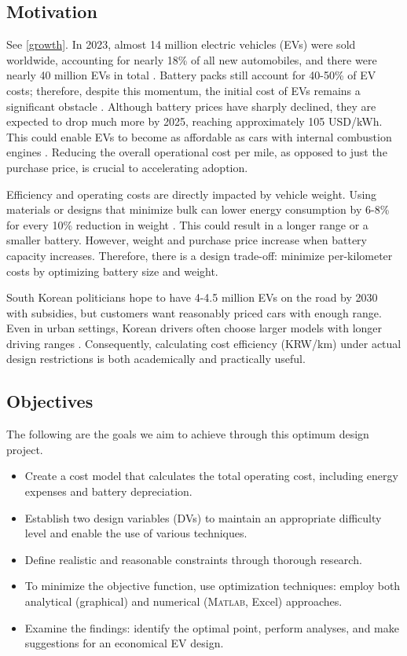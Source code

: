 \documentclass[11pt,twocolumn]{article}
\begin{document}
        \subsection{Motivation}
            See \cref{growth}.
            In 2023, almost 14 million electric vehicles (EVs) were sold worldwide, accounting for nearly 18\% of all new automobiles, and there were nearly 40 million EVs in total \cite{iea24}.
            Battery packs still account for 40-50\% of EV costs; therefore, despite this momentum, the initial cost of EVs remains a significant obstacle \cite{doe23}.
            Although battery prices have sharply declined, they are expected to drop much more by 2025, reaching approximately 105 USD/kWh. This could enable EVs to become as affordable as cars with internal combustion engines \cite{doe23}.
            Reducing the overall operational cost per mile, as opposed to just the purchase price, is crucial to accelerating adoption.
            \par
            Efficiency and operating costs are directly impacted by vehicle weight.
            Using materials or designs that minimize bulk can lower energy consumption by 6-8\% for every 10\% reduction in weight \cite{doe23b}.
            This could result in a longer range or a smaller battery.
            However, weight and purchase price increase when battery capacity increases.
            Therefore, there is a design trade-off: minimize per-kilometer costs by optimizing battery size and weight.
            \par
            South Korean politicians hope to have 4-4.5 million EVs on the road by 2030 with subsidies, but customers want reasonably priced cars with enough range.
            Even in urban settings, Korean drivers often choose larger models with longer driving ranges \cite{iea23}\cite{nrel23}.
            Consequently, calculating cost efficiency (KRW/km) under actual design restrictions is both academically and practically useful.
        \subsection{Objectives}
            The following are the goals we aim to achieve through this optimum design project.
                \begin{itemize}
                    \item Create a cost model that calculates the total operating cost, including energy expenses and battery depreciation.
                    \item Establish two design variables (DVs) to maintain an appropriate difficulty level and enable the use of various techniques.
                    \item Define realistic and reasonable constraints through thorough research.
                    \item To minimize the objective function, use optimization techniques: employ both analytical (graphical) and numerical (\textsc{Matlab}, Excel) approaches.
                    \item Examine the findings: identify the optimal point, perform analyses, and make suggestions for an economical EV design.
                \end{itemize}
\end{document}
